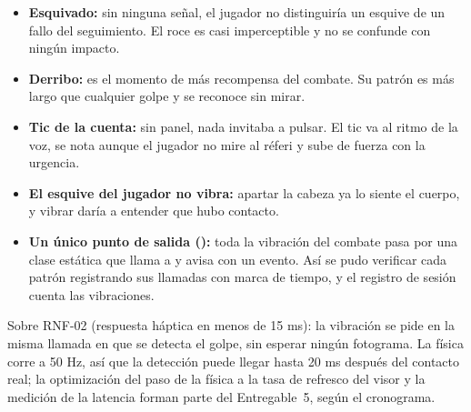\begin{table}[H]
\centering
\caption{Patrones hápticos añadidos en el Entregable 4.}
\label{tab:haptica4}
\end{table}

\begin{itemize}
  \item \textbf{Esquivado:} sin ninguna señal, el jugador no distinguiría un esquive de un fallo del seguimiento. El roce es casi imperceptible y no se confunde con ningún impacto.
  \item \textbf{Derribo:} es el momento de más recompensa del combate. Su patrón es más largo que cualquier golpe y se reconoce sin mirar.
  \item \textbf{Tic de la cuenta:} sin panel, nada invitaba a pulsar. El tic va al ritmo de la voz, se nota aunque el jugador no mire al réferi y sube de fuerza con la urgencia.
  \item \textbf{El esquive del jugador no vibra:} apartar la cabeza ya lo siente el cuerpo, y vibrar daría a entender que hubo contacto.
  \item \textbf{Un único punto de salida ():} toda la vibración del combate pasa por una clase estática que llama a  y avisa con un evento. Así se pudo verificar cada patrón registrando sus llamadas con marca de tiempo, y el registro de sesión cuenta las vibraciones.
\end{itemize}

Sobre RNF-02 (respuesta háptica en menos de 15 ms): la vibración se pide en la misma llamada en que se detecta el golpe, sin esperar ningún fotograma. La física corre a 50 Hz, así que la detección puede llegar hasta 20 ms después del contacto real; la optimización del paso de la física a la tasa de refresco del visor y la medición de la latencia forman parte del Entregable~5, según el cronograma.

